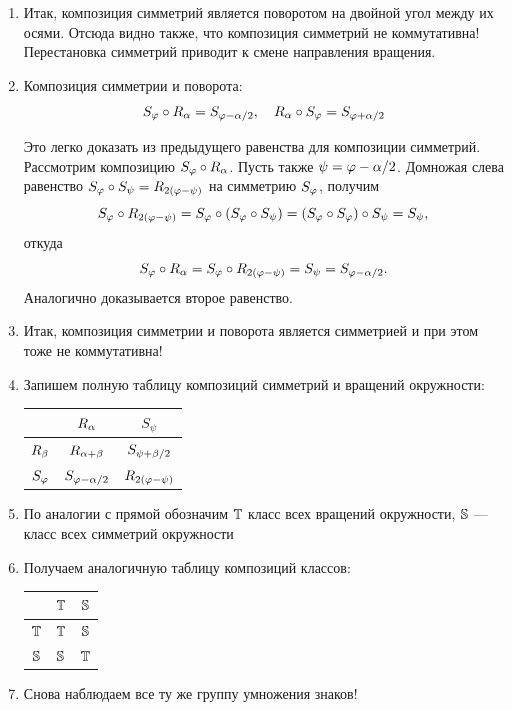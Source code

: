 \begin{enumerate}
\item Итак, композиция симметрий является поворотом на двойной угол между их осями. Отсюда видно также, что композиция симметрий не коммутативна! Перестановка симметрий приводит к смене направления вращения.
\item Композиция симметрии и поворота:
$$
S_\ph\circ R_\al = S_{\ph-\al/2},\quad R_\al\circ S_\ph = S_{\ph+\al/2}
$$

Это легко доказать из предыдущего равенства для композиции симметрий. Рассмотрим композицию $S_\ph\circ R_\al$. Пусть также $\psi = \ph-\al/2$. Домножая слева равенство $S_\ph\circ S_\psi=R_{2(\ph-\psi)}$ на симметрию $S_\ph$, получим
$$
S_\ph\circ R_{2(\ph-\psi)}=S_\ph\circ (S_\ph\circ S_\psi)=(S_\ph\circ S_\ph)\circ S_\psi=S_\psi,
$$
откуда
$$
S_\ph\circ R_\al = S_\ph\circ R_{2(\ph-\psi)} = S_\psi = S_{\ph-\al/2}.
$$
Аналогично доказывается второе равенство.
\item Итак, композиция симметрии и поворота является симметрией и при этом тоже не коммутативна!
\item Запишем полную таблицу композиций симметрий и вращений окружности:
\begin{center}
\begin{tabular}{c|c|c|}
  & $R_\al$ & $S_\psi$ \\
 \hline
$R_\be$ & $R_{\al+\be}$ & $S_{\psi+\be/2}$ \\
 \hline
$S_\ph$ & $S_{\ph-\al/2}$ & $R_{2(\ph-\psi)}$ \\
\hline
\end{tabular}
\end{center}
\item По аналогии с прямой обозначим $\T$ класс всех вращений окружности, $\S$ --- класс всех симметрий окружности
\item Получаем аналогичную таблицу композиций классов:
\begin{center}
\begin{tabular}{c|c|c|}
  & $\T$ & $\S$ \\
 \hline
$\T$ & $\T$ & $\S$ \\
 \hline
$\S$ & $\S$ & $\T$ \\
\hline
\end{tabular}
\end{center}

\item Снова наблюдаем все ту же группу умножения знаков!





\end{enumerate}
